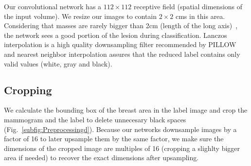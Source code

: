 Our convolutional network has a $112 \times 112$ receptive field (spatial dimensions of the input volume).
We resize our images to contain $2 \times 2$ cms in this area. Considering that masses are rarely bigger than 2cm (length of the long axis)~\cite{Sahiner1996}, the network sees a good portion of the lesion during classification.
Lanczos interpolation is a high quality downsampling filter recommended by PILLOW and nearest neighbor interpolation assures that the reduced label contains only valid values (white, gray and black).


\subsection{Cropping}
We calculate the bounding box of the breast area in the label image and crop the mammogram and the label to delete unnecesary black spaces (Fig.~\ref{subfig:Preprocessingd}). 
Because our networks downsample images by a factor of 16 to later upsample them by the same factor, we make sure the dimensions of the cropped image are multiples of 16 (cropping a slighlty bigger area if needed) to recover the exact dimensions after upsampling.

